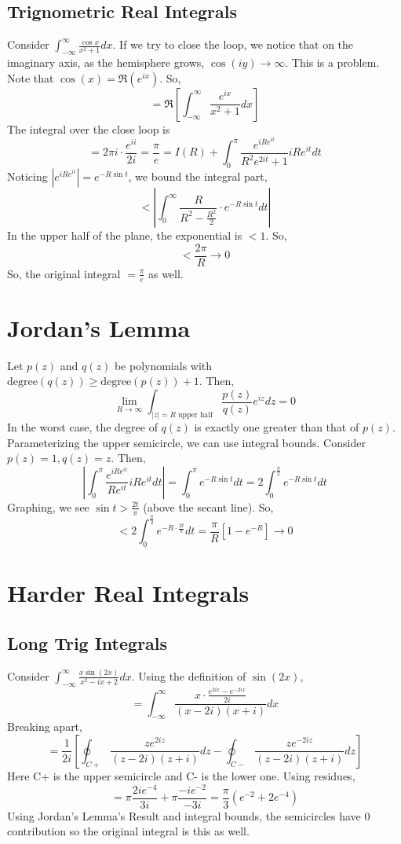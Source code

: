 \documentclass[../main.tex]{subfiles}
\begin{document}
\subsection{Trignometric Real Integrals}
Consider $\int_{-\infty}^{\infty}\frac{\cos x}{x^{2}+1}dx$. If we try to close the loop, we notice that on the imaginary axis,
as the hemisphere grows, $\cos(iy)\rightarrow \infty$. This is a problem. Note that $\cos(x)=\Re(e^{ix})$.
So,
$$=\Re\left[\int_{-\infty}^{\infty}\frac{e^{ix}}{x^{2}+1}dx\right]$$
The integral over the close loop is
$$=2\pi i\cdot \frac{e^{ii}}{2i}=\frac{\pi}{e}=I(R)+
\int_{0}^{\pi}\frac{e^{iRe^{it}}}{R^{2}e^{2it}+1}iRe^{it}dt$$
Noticing $|e^{iRe^{it}}|=e^{-R\sin t}$, we bound the integral part,
$$<\left|\int_{0}^{\infty}\frac{R}{R^{2}-\frac{R^{2}}{2}}\cdot e^{-R\sin t}dt\right|$$
In the upper half of the plane, the exponential is $<1$. So,
$$<\frac{2\pi}{R}\rightarrow 0$$
So, the original integral $=\frac{\pi}{e}$ as well.

\section{Jordan's Lemma}
Let $p(z)$ and $q(z)$ be polynomials with $\text{degree}(q(z))\geq \text{degree}(p(z))+1$. Then,
$$\lim_{R\rightarrow\infty}\int_{|z|=R\text{ upper half}}\frac{p(z)}{q(z)}e^{iz}dz=0$$
In the worst case, the degree of $q(z)$ is exactly one greater than that of $p(z)$. Parameterizing
the upper semicircle, we can use integral bounds. Consider $p(z)=1,q(z)=z$. Then,
$$\left|\int_{0}^{\pi}\frac{e^{iRe^{it}}}{Re^{it}}iRe^{it}dt\right|
=\int_{0}^{\pi}e^{-R\sin t}dt=2\int_{0}^{\frac{\pi}{2}}e^{-R\sin t}dt$$
Graphing, we see $\sin t>\frac{2t}{\pi}$ (above the secant line). So,
$$<2\int_{0}^{\frac{\pi}{2}}e^{-R\cdot \frac{2t}{\pi}}dt=\frac{\pi}{R}\left[1-e^{-R}\right]
\rightarrow 0$$

\section{Harder Real Integrals}
\subsection{Long Trig Integrals}
Consider $\int_{-\infty}^{\infty}\frac{x\sin (2x)}{x^{2}-ix+2}dx$. Using the definition of $\sin(2x)$,
$$=\int_{-\infty}^{\infty}\frac{x\cdot \frac{e^{2ix}-e^{-2ix}}{2i}}{(x-2i)(x+i)}dx$$
Breaking apart,
$$=\frac{1}{2i}\left[\oint_{C+}\frac{ze^{2iz}}{(z-2i)(z+i)}dz
-\oint_{C-}\frac{ze^{-2iz}}{(z-2i)(z+i)}dz\right]$$
Here C+ is the upper semicircle and C- is the lower one. Using residues,
$$=\pi \frac{2ie^{-4}}{3i}+\pi\frac{-ie^{-2}}{-3i}=\frac{\pi}{3}(e^{-2}+2e^{-4})$$
Using Jordan's Lemma's Result and integral bounds, the semicircles have $0$ contribution
so the original integral is this as well.
\end{document}
